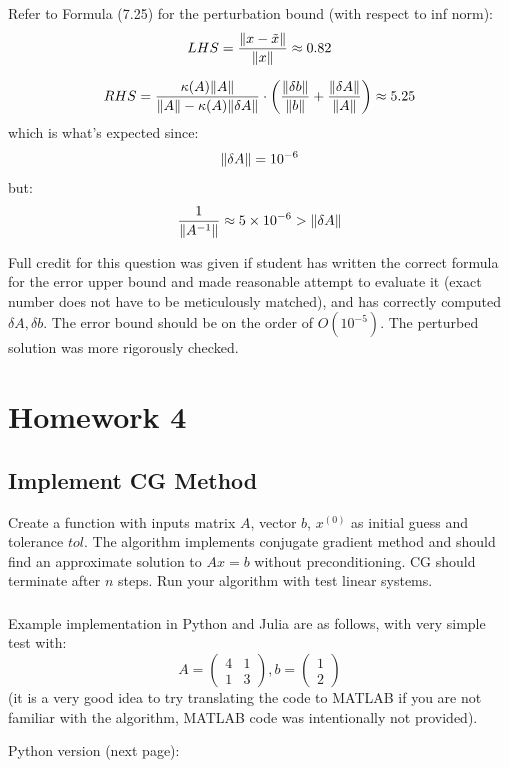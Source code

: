 \documentclass[12pt]{article} %
\newcommand{\ka}{\kappa}
\newcommand{\1}[1]{\mathds{1}\left[#1\right]}
\begin{document}
Refer to Formula (7.25) for the perturbation bound (with respect to inf norm):
$$
	LHS = \frac{\norm{x - \tilde{x}}}{\norm{x}} \approx 0.82
$$

$$
	RHS = 
	\frac{\ka(A)\norm{A}}{\norm{A} - \ka(A)\norm{\delta A}}\cdot\bigg(
	\frac{\norm{\delta b}}{\norm{b}}+\frac{\norm{\delta A}}{\norm{A}}
	\bigg) \approx 5.25
$$ which is what's expected since:
$$
	\norm{\delta A} = 10^{-6}
$$ but:
$$
	\frac{1}{\norm{A^{-1}}}\approx 5\times 10^{-6} > \norm{\delta A}
$$

Full credit for this question was given if student has written the correct formula for the error upper bound and made reasonable attempt to evaluate it (exact number does not have to be meticulously matched), and has correctly computed $\delta A,\delta b$. The error bound should be on the order of $O(10^{-5})$. The perturbed solution was more rigorously checked.

\newpage



\section{Homework 4}
\subsection{Implement CG Method}
Create a function with inputs matrix $A$, vector $b$, $x^{(0)}$ as initial guess and tolerance $tol$. The algorithm implements conjugate gradient method and should find an approximate solution to $Ax = b$ without preconditioning. CG should terminate after $n$ steps. Run your algorithm with test linear systems.

\subsubsection{}
Example implementation in Python and Julia are as follows, with very simple test with:
$$
A =\begin{pmatrix}
	4 & 1\\
	1 & 3
\end{pmatrix}, b=
\begin{pmatrix}
	1 \\
	2
\end{pmatrix}
$$ (it is a very good idea to try translating the code to MATLAB if you are not familiar with the algorithm, MATLAB code was intentionally not provided).


Python version (next page):


\end{document}
